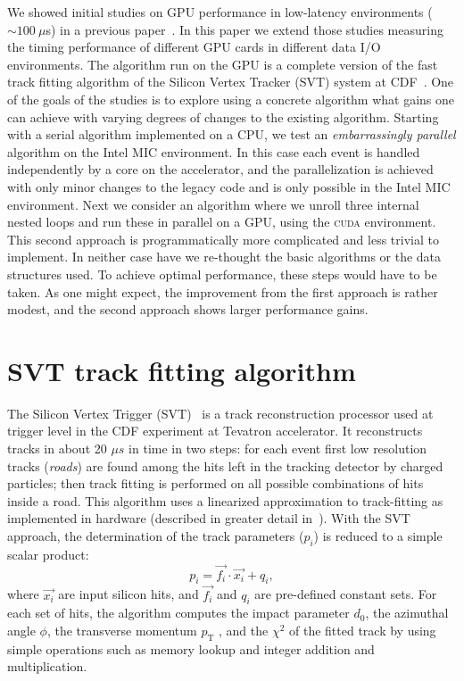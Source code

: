 \documentclass[letterpaper]{jpconf}
\begin{document}
We showed initial studies on GPU performance in low-latency
environments ($\sim 100~\mu$s) in a previous
paper~\cite{TIPP2011,NSS2012}.  In this paper we extend those studies
measuring the timing performance of different GPU cards in different
data I/O environments. The algorithm run on the GPU is a complete
version of the fast track fitting algorithm of the Silicon Vertex
Tracker (SVT) system at CDF~\cite{SVT1}.
One of the goals of the studies is to explore using a concrete
algorithm what gains one can achieve with varying degrees of changes
to the existing algorithm. Starting with a serial algorithm
implemented on a CPU, we test an \textit{embarrassingly parallel}
algorithm on the Intel MIC environment. In this case each event is
handled independently by a core on the accelerator, and the
parallelization is achieved with only minor changes to the legacy code
and is only possible in the Intel MIC environment. Next we consider an
algorithm where we unroll three internal nested loops and run these in
parallel on a GPU, using the \textsc{cuda} environment. This second
approach is programmatically more complicated and less trivial to
implement. In neither case have we re-thought the basic algorithms or
the data structures used. To achieve optimal performance, these steps
would have to be taken.  As one might expect, the improvement from the
first approach is rather modest, and the second approach shows larger
performance gains.

\section{SVT track fitting algorithm}
The Silicon Vertex Trigger (SVT)~\cite{SVT1,SVT2} is a 
track reconstruction processor used at 
trigger level in the CDF experiment at Tevatron accelerator. It reconstructs 
tracks in about 20 $\mu s$ in time in two steps: for each event 
first low resolution tracks (\textit{roads}) are found among the hits left 
in the tracking detector by charged particles; then track fitting is 
performed on all possible combinations of hits inside a road. 
This algorithm uses a linearized approximation to track-fitting as 
implemented in hardware (described in greater detail in~\cite{SVT3}). 
With the SVT approach, the determination of the track parameters 
($p_i$) is reduced to a simple scalar product:
\[
p_i = \vec{f_i} \cdot \vec{x_i} + q_i,
\]
where $\vec{x_i}$ are input silicon hits, and $\vec{f_i}$ and $q_i$ are 
pre-defined constant sets. For each set of hits, the algorithm
computes the impact parameter $d_0$, the azimuthal angle $\phi$, 
the transverse momentum $p_\mathrm{T}$ , and the $\chi^2$ of the
fitted track by using simple operations such as memory lookup and 
integer addition and multiplication.
\end{document}
